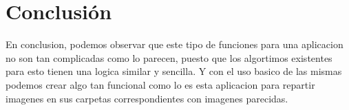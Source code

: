\documentclass[12pt,twocolumn,letterpaper]{article}
\begin{document}
\section{Conclusi\'on}
En conclusion, podemos observar que este tipo de funciones para una aplicacion no son tan complicadas como lo parecen, puesto que los algortimos existentes para esto tienen una logica similar y sencilla. Y con el uso basico de las mismas podemos crear algo tan funcional como lo es esta aplicacion para repartir imagenes en sus carpetas correspondientes con imagenes parecidas.
\end{document}
